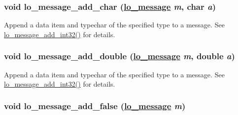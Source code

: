 \hypertarget{group__liblolowlevel_ga40601d4b2be072f4c7e63def43a062e}{
\subsubsection[lo\_\-message\_\-add\_\-char]{\setlength{\rightskip}{0pt plus 5cm}void lo\_\-message\_\-add\_\-char (\hyperlink{lo__types_8h_d126083c98d941f00eb72d1690b38d63}{lo\_\-message} {\em m}, char {\em a})}}
\label{group__liblolowlevel_ga40601d4b2be072f4c7e63def43a062e}


Append a data item and typechar of the specified type to a message. See \hyperlink{group__liblolowlevel_g31ac1e4c0ec6c61f665ce3f9bbdc53c3}{lo\_\-message\_\-add\_\-int32()} for details. 

\hypertarget{group__liblolowlevel_gd620fb686a8bdaf23e4bbe7a74b2ae66}{
\subsubsection[lo\_\-message\_\-add\_\-double]{\setlength{\rightskip}{0pt plus 5cm}void lo\_\-message\_\-add\_\-double (\hyperlink{lo__types_8h_d126083c98d941f00eb72d1690b38d63}{lo\_\-message} {\em m}, double {\em a})}}
\label{group__liblolowlevel_gd620fb686a8bdaf23e4bbe7a74b2ae66}


Append a data item and typechar of the specified type to a message. See \hyperlink{group__liblolowlevel_g31ac1e4c0ec6c61f665ce3f9bbdc53c3}{lo\_\-message\_\-add\_\-int32()} for details. 

\hypertarget{group__liblolowlevel_g422d7d8c097533bbf035cd3dfbe1721e}{
\subsubsection[lo\_\-message\_\-add\_\-false]{\setlength{\rightskip}{0pt plus 5cm}void lo\_\-message\_\-add\_\-false (\hyperlink{lo__types_8h_d126083c98d941f00eb72d1690b38d63}{lo\_\-message} {\em m})}}
\label{group__liblolowlevel_g422d7d8c097533bbf035cd3dfbe1721e}


